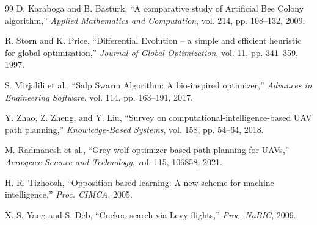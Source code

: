 \documentclass[12pt,a4paper]{article}
\begin{document}
\begin{thebibliography}{99}
D. Karaboga and B. Basturk,
``A comparative study of Artificial Bee Colony algorithm,''
\textit{Applied Mathematics and Computation}, vol. 214, pp. 108--132, 2009.

R. Storn and K. Price,
``Differential Evolution -- a simple and efficient heuristic for global optimization,''
\textit{Journal of Global Optimization}, vol. 11, pp. 341--359, 1997.

S. Mirjalili et al.,
``Salp Swarm Algorithm: A bio-inspired optimizer,''
\textit{Advances in Engineering Software}, vol. 114, pp. 163--191, 2017.

Y. Zhao, Z. Zheng, and Y. Liu,
``Survey on computational-intelligence-based UAV path planning,''
\textit{Knowledge-Based Systems}, vol. 158, pp. 54--64, 2018.

M. Radmanesh et al.,
``Grey wolf optimizer based path planning for UAVs,''
\textit{Aerospace Science and Technology}, vol. 115, 106858, 2021.

H. R. Tizhoosh,
``Opposition-based learning: A new scheme for machine intelligence,''
\textit{Proc. CIMCA}, 2005.

X. S. Yang and S. Deb,
``Cuckoo search via Levy flights,''
\textit{Proc. NaBIC}, 2009.
\end{thebibliography}
\end{document}
